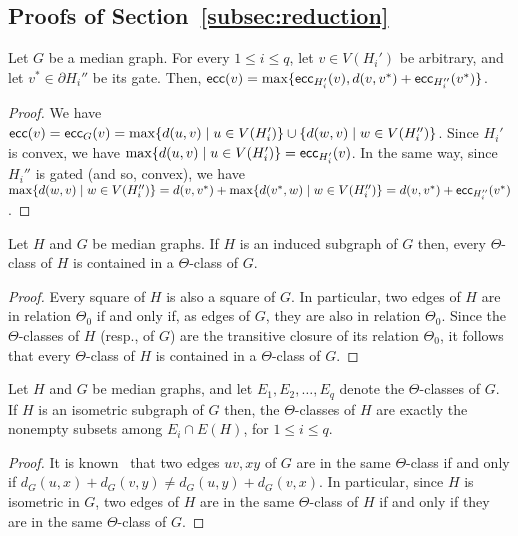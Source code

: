 \documentclass[a4paper,UKenglish,numberwithinsect,cleveref, autoref]{lipics-v2021}
\newcommand{\ecc}{\mbox{\textsf{ecc}}}
\begin{document}
\subsection{Proofs of Section~\ref{subsec:reduction}} \label{asubsec:reduction}

\begin{lemma}\label{lem:guigui-1}
Let $G$ be a median graph.
For every $1 \leq i \leq q$, let $v \in V(H_i')$ be arbitrary, and let $v^* \in \partial H_i''$ be its gate.
Then, $\ecc(v) = \max\{\ecc_{H_i'}(v), d(v,v^*) + \ecc_{H_i''}(v^*)\}$.
\end{lemma}
\begin{proof}
We have $\ecc(v) = \ecc_G(v) = \max\{d(u,v) \mid u \in V(H_i')\} \cup \{d(w,v) \mid w \in V(H_i'')\}$.
Since $H_i'$ is convex, we have $\max\{d(u,v) \mid u \in V(H_i')\} = \ecc_{H_i'}(v)$.
In the same way, since $H_i''$ is gated (and so, convex), we have $\max\{d(w,v) \mid w \in V(H_i'')\} = d(v,v^*) + \max\{d(v^*,w) \mid w \in V(H_i'')\} = d(v,v^*) + \ecc_{H_i''}(v^*)$.
\end{proof}

\begin{lemma}\label{lem:guigui-2}
Let $H$ and $G$ be median graphs.
If $H$ is an induced subgraph of $G$ then, every $\Theta$-class of $H$ is contained in a $\Theta$-class of $G$.
\end{lemma}
\begin{proof}
Every square of $H$ is also a square of $G$.
In particular, two edges of $H$ are in relation $\Theta_0$ if and only if, as edges of $G$, they are also in relation $\Theta_0$.
Since the $\Theta$-classes of $H$ (resp., of $G$) are the transitive closure of its relation $\Theta_0$, it follows that every $\Theta$-class of $H$ is contained in a $\Theta$-class of $G$.
\end{proof}

\begin{lemma}\label{lem:guigui-2bis}
Let $H$ and $G$ be median graphs, and let $E_1,E_2,\ldots,E_q$ denote the $\Theta$-classes of $G$.
If $H$ is an isometric subgraph of $G$ then, the $\Theta$-classes of $H$ are exactly the nonempty subsets among $E_i \cap E(H)$, for $1 \leq i \leq q$.
\end{lemma}
\begin{proof}
It is known~\cite{winkler1984isometric} that two edges $uv,xy$ of $G$ are in the same $\Theta$-class if and only if $d_G(u,x) + d_G(v,y) \neq d_G(u,y) + d_G(v,x)$.
In particular, since $H$ is isometric in $G$, two edges of $H$ are in the same $\Theta$-class of $H$ if and only if they are in the same $\Theta$-class of $G$.
\end{proof}
\end{document}
